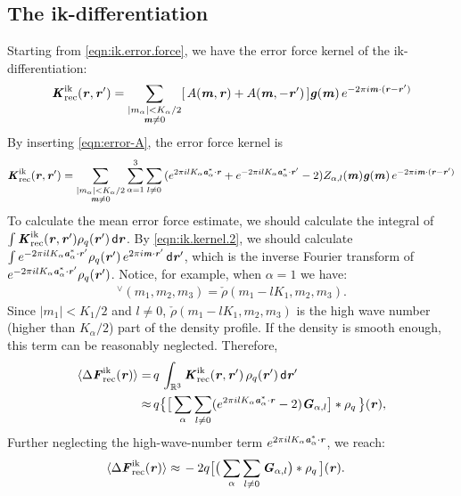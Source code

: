 \documentclass[journal=jacsat,manuscript=article]{achemso}
\renewcommand{\v}[1]{\textbf{\textit{#1}}}
\renewcommand{\d}[1]{\textsf{#1}}
\begin{document}
\subsection{The ik-differentiation}
Starting from \ref{eqn:ik.error.force}, we have the error force kernel
of the ik-differentiation:
\begin{align}
  \v K^{\textrm{ik}}_{\textrm{rec}}(\v r, \v r')
  =
  \sum_{
    \begin{subarray}{c}
      \vert m_{\alpha}\vert < K_\alpha/2\\
      \v m\neq 0
    \end{subarray}}
  [\,A(\v m, \v r) + A(\v m,-\v r')\,]
  \v g(\v m)\,e^{-2\pi i\v m\cdot(\v r-\v r')}
\end{align}
By inserting \ref{eqn:error-A}, the error force kernel is
\begin{align}
  \label{eqn:ik.kernel.2}
  \v K^{\textrm{ik}}_{\textrm{rec}}(\v r, \v r')
  =
  \sum_{
    \begin{subarray}{c}
      \vert m_{\alpha}\vert < K_\alpha/2\\
      \v m\neq 0
    \end{subarray}}
  \sum_{\alpha=1}^3\sum_{l\neq 0}
  \,(
  e^{2\pi i l K_\alpha\v a^\ast_\alpha\cdot \v r} +
  e^{-2\pi i l K_\alpha\v a^\ast_\alpha\cdot \v r'}
  - 2
  )
  Z_{\alpha,l}(\v m)
  \v g(\v m)\,e^{-2\pi i\v m\cdot(\v r-\v r')}
\end{align}
To calculate the mean error force estimate, we should
calculate the integral of
$\int \v K^{\textrm{ik}}_{\textrm{rec}}(\v r, \v r')\rho_q(\v r')\,\d d\v r$.
By \ref{eqn:ik.kernel.2}, we should calculate
$  \int e^{-2\pi i l K_\alpha\v a^\ast_\alpha\cdot \v r'}\rho_q(\v r')
\,e^{2\pi i\v m\cdot\v r'}\,\d d\v r'$, which is the inverse Fourier transform
of $e^{-2\pi i l K_\alpha\v a^\ast_\alpha\cdot \v r'}\rho_q(\v r')$. Notice,
for example, when $\alpha=1$ we have:
\begin{align}
  [\,\rho_q(\v r')\,e^{-2\pi i l K_1\v a^\ast_1\cdot \v r'}\,] ^\vee
  (m_1, m_2, m_3)
  = \check\rho(m_1-lK_1, m_2, m_3).
\end{align}
Since $\vert m_1\vert < K_1/2$ and $l\neq 0$,
$\check\rho(m_1-lK_1, m_2, m_3)$ is
the high wave number (higher than $K_\alpha / 2$) part of the density profile.
If the density is smooth enough, this term can be reasonably neglected.
Therefore,
\begin{align}\nonumber
  \langle\Delta\v F^{\textrm{ik}}_{\textrm{rec}}(\v r)\rangle
  =\,&
  q\, \int_{\mathbb R^3}
  \v K^{\textrm{ik}}_{\textrm{rec}} (\v r,\v r')\,\rho_q(\v r')\,\d d\v r'\\
  \approx\,&
  q
  \big\{
  \big[
  \sum_{\alpha}\sum_{l\neq 0}
  (e^{2\pi i l K_\alpha\v a^\ast_\alpha\cdot \v r}   - 2 )
  \v G_{\alpha,l}
  \big]
  \ast\rho_q\,
  \big\} (\v r),
\end{align}
Further neglecting the
high-wave-number term $e^{2\pi i l K_\alpha\v a^\ast_\alpha\cdot \v r}$, we reach:
\begin{align}
  \langle\Delta\v F^{\textrm{ik}}_{\textrm{rec}}(\v r)\rangle
  \approx\,&
  -2q
  \big[
  \big(
  \sum_{\alpha}\sum_{l\neq 0}\v G_{\alpha,l}
  \big)
  \ast\rho_q\,
  \big] (\v r).
\end{align}
\end{document}
